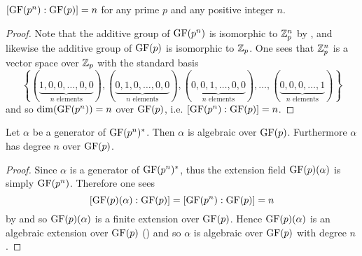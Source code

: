\begin{corollary}\label{corollary-degree-of-finite-field-to-prime-power}
    $[\mathrm{GF}(p^n): \mathrm{GF}(p)] = n$ for any prime $p$ and any positive integer $n$.
\end{corollary}
\begin{proof}
    Note that the additive group of $\mathrm{GF}(p^n)$ is isomorphic to $\mathbb{Z}_p^n$ by , and likewise the additive group of $\mathrm{GF}(p)$ is isomorphic to $\mathbb{Z}_p$. One sees that $\mathbb{Z}_p^n$ is a vector space over $\mathbb{Z}_p$ with the standard basis
    \[
        \left\{(\underbrace{1, 0, 0, \dots, 0, 0}_{n \text{ elements}}), (\underbrace{0, 1, 0, \dots, 0, 0}_{n \text{ elements}}), (\underbrace{0, 0, 1, \dots, 0, 0}_{n \text{ elements}}), \dots, (\underbrace{0, 0, 0, \dots, 1}_{n \text{ elements}})\right\}
    \]
    and so $\dim{\GF{p^n}} = n$ over $\mathrm{GF}(p)$, i.e. $[\mathrm{GF}(p^n): \mathrm{GF}(p)] = n$.
\end{proof}

\begin{corollary}\label{corollary-generator-of-finite-field-is-algebraic-over-subfield}
    Let $\alpha$ be a generator of $\mathrm{GF}(p^n)^\ast$. Then $\alpha$ is algebraic over $\mathrm{GF}(p)$. Furthermore $\alpha$ has degree $n$ over $\mathrm{GF}(p)$.
\end{corollary}
\begin{proof}
    Since $\alpha$ is a generator of $\mathrm{GF}(p^n)^\ast$, thus the extension field $\mathrm{GF}(p)(\alpha)$ is simply $\mathrm{GF}(p^n)$. Therefore one sees
    \[
        [\mathrm{GF}(p)(\alpha): \mathrm{GF}(p)] = [\mathrm{GF}(p^n):\mathrm{GF}(p)] = n
    \]
    by  and so $\mathrm{GF}(p)(\alpha)$ is a finite extension over $\mathrm{GF}(p)$. Hence $\mathrm{GF}(p)(\alpha)$ is an algebraic extension over $\mathrm{GF}(p)$ () and so $\alpha$ is algebraic over $\mathrm{GF}(p)$ with degree $n$.
\end{proof}

